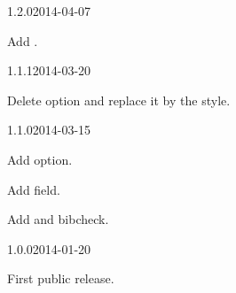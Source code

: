 \documentclass{ltxdockit}[2011/03/25]
\begin{document}
\begin{changelog}
\begin{release}{1.2.0}{2014-04-07}
	\item Add .
\end{release}

\begin{release}{1.1.1}{2014-03-20}
	\item Delete  option and replace it by the  style. 
\end{release}

\begin{release}{1.1.0}{2014-03-15}
\item Add  option.
\item Add  field.
\item Add  and  bibcheck. 
\end{release}

\begin{release}{1.0.0}{2014-01-20}
\item First public release.
\end{release}
\end{changelog}
\end{document}
